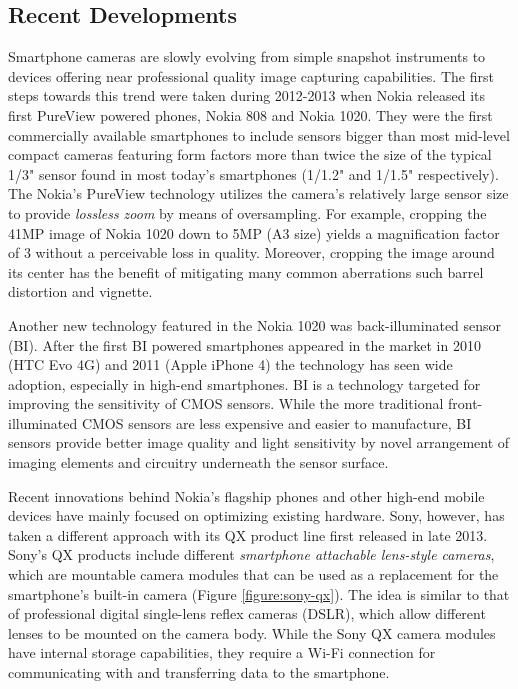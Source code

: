 \documentclass[thesis.tex]{subfiles}
\begin{document}
\subsection{Recent Developments}\label{chapter:solutions}

Smartphone cameras are slowly evolving from simple snapshot instruments to devices offering near professional quality image capturing capabilities. The first steps towards this trend were taken during 2012-2013 when Nokia released its first PureView powered phones, Nokia 808 and Nokia 1020. They were the first commercially available smartphones to include sensors bigger than most mid-level compact cameras featuring form factors more than twice the size of the typical 1/3" sensor found in most today's smartphones (1/1.2" and 1/1.5" respectively). The Nokia's PureView technology utilizes the camera's relatively large sensor size to provide \textit{lossless zoom} by means of oversampling. For example, cropping the 41MP image of Nokia 1020 down to 5MP (A3 size) yields a magnification factor of 3 without a perceivable loss in quality. Moreover, cropping the image around its center has the benefit of mitigating many common aberrations such barrel distortion and vignette. \cite{lumia_1020}

Another new technology featured in the Nokia 1020 was back-illuminated sensor (BI). After the first BI powered smartphones appeared in the market in 2010 (HTC Evo 4G) and 2011 (Apple iPhone 4) the technology has seen wide adoption, especially in high-end smartphones. BI is a technology targeted for improving the sensitivity of CMOS sensors. While the more traditional front-illuminated CMOS sensors are less expensive and easier to manufacture, BI sensors provide better image quality and light sensitivity by novel arrangement of imaging elements and circuitry underneath the sensor surface.

Recent innovations behind Nokia's flagship phones and other high-end mobile devices have mainly focused on optimizing existing hardware. Sony, however, has taken a different approach with its QX product line first released in late 2013. Sony's QX products include different \textit{smartphone attachable lens-style cameras}, which are mountable camera modules that can be used as a replacement for the smartphone's built-in camera (Figure \ref{figure:sony-qx}). The idea is similar to that of professional digital single-lens reflex cameras (DSLR), which allow different lenses to be mounted on the camera body. While the Sony QX camera modules have internal storage capabilities, they require a Wi-Fi connection for communicating with and transferring data to the smartphone.
\end{document}
